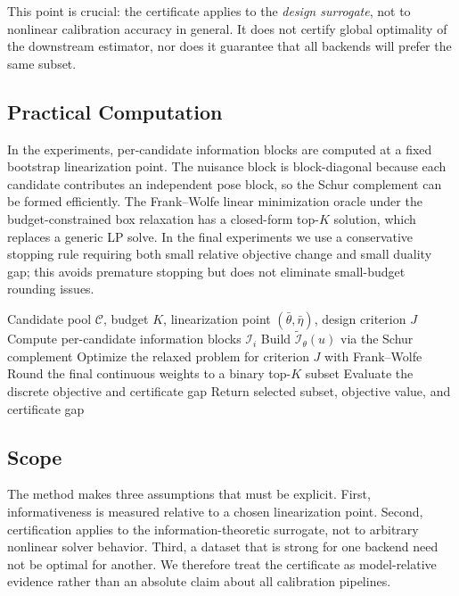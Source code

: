 \documentclass[11pt]{article}
\begin{document}
This point is crucial: the certificate applies to the \emph{design surrogate},
not to nonlinear calibration accuracy in general. It does not certify global
optimality of the downstream estimator, nor does it guarantee that all
backends will prefer the same subset.

\subsection{Practical Computation}
In the experiments, per-candidate information blocks are computed at a fixed
bootstrap linearization point. The nuisance block is block-diagonal because each
candidate contributes an independent pose block, so the Schur complement can be
formed efficiently. The Frank--Wolfe linear minimization oracle under the
budget-constrained box relaxation has a closed-form top-$K$ solution, which
replaces a generic LP solve. In the final experiments we use a conservative
stopping rule requiring both small relative objective change and small duality
gap; this avoids premature stopping but does not eliminate small-budget
rounding issues.

\begin{algorithm}[ht]
\caption{Certifiable Calibration Data Selection}
\begin{algorithmic}[1]
\Require Candidate pool $\mathcal{C}$, budget $K$, linearization point
$(\bar{\theta},\bar{\eta})$, design criterion $J$
\State Compute per-candidate information blocks $\mathcal{I}_i$
\State Build $\widetilde{\mathcal{I}}_\theta(u)$ via the Schur complement
\State Optimize the relaxed problem for criterion $J$ with Frank--Wolfe
\State Round the final continuous weights to a binary top-$K$ subset
\State Evaluate the discrete objective and certificate gap
\State Return selected subset, objective value, and certificate gap
\end{algorithmic}
\end{algorithm}

\subsection{Scope}
The method makes three assumptions that must be explicit.
First, informativeness is measured relative to a chosen linearization point.
Second, certification applies to the information-theoretic surrogate, not to
arbitrary nonlinear solver behavior. Third, a dataset that is strong for one
backend need not be optimal for another. We therefore treat the certificate as
model-relative evidence rather than an absolute claim about all calibration
pipelines.
\end{document}

